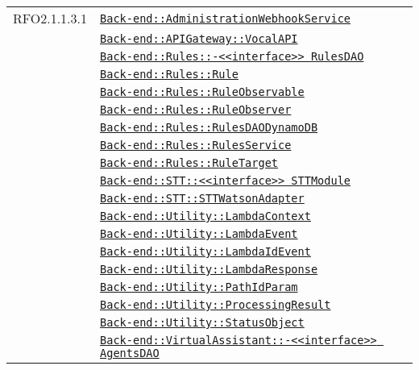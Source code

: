 \begin{longtable}{|>{\centering}m{3cm}|m{10cm}<{\centering}|}
RFO2.1.1.3.1 & \hyperref[Back-end::AdministrationWebhookService]{\texttt{Back-end::AdministrationWebhookService}}\\
& \hyperref[Back-end::APIGateway::VocalAPI]{\texttt{Back-end::APIGateway::VocalAPI}}\\
& \hyperref[Back-end::Rules::<<interface>> RulesDAO]{\texttt{Back-end::Rules::-\linebreak <<interface>> RulesDAO}}\\
& \hyperref[Back-end::Rules::Rule]{\texttt{Back-end::Rules::Rule}}\\
& \hyperref[Back-end::Rules::RuleObservable]{\texttt{Back-end::Rules::RuleObservable}}\\
& \hyperref[Back-end::Rules::RuleObserver]{\texttt{Back-end::Rules::RuleObserver}}\\
& \hyperref[Back-end::Rules::RulesDAODynamoDB]{\texttt{Back-end::Rules::RulesDAODynamoDB}}\\
& \hyperref[Back-end::Rules::RulesService]{\texttt{Back-end::Rules::RulesService}}\\
& \hyperref[Back-end::Rules::RuleTarget]{\texttt{Back-end::Rules::RuleTarget}}\\
& \hyperref[Back-end::STT::<<interface>> STTModule]{\texttt{Back-end::STT::<<interface>> STTModule}}\\
& \hyperref[Back-end::STT::STTWatsonAdapter]{\texttt{Back-end::STT::STTWatsonAdapter}}\\
& \hyperref[Back-end::Utility::LambdaContext]{\texttt{Back-end::Utility::LambdaContext}}\\
& \hyperref[Back-end::Utility::LambdaEvent]{\texttt{Back-end::Utility::LambdaEvent}}\\
& \hyperref[Back-end::Utility::LambdaIdEvent]{\texttt{Back-end::Utility::LambdaIdEvent}}\\
& \hyperref[Back-end::Utility::LambdaResponse]{\texttt{Back-end::Utility::LambdaResponse}}\\
& \hyperref[Back-end::Utility::PathIdParam]{\texttt{Back-end::Utility::PathIdParam}}\\
& \hyperref[Back-end::Utility::ProcessingResult]{\texttt{Back-end::Utility::ProcessingResult}}\\
& \hyperref[Back-end::Utility::StatusObject]{\texttt{Back-end::Utility::StatusObject}}\\
& \hyperref[Back-end::VirtualAssistant::<<interface>> AgentsDAO]{\texttt{Back-end::VirtualAssistant::-\linebreak <<interface>> AgentsDAO}}\\

\end{longtable}
